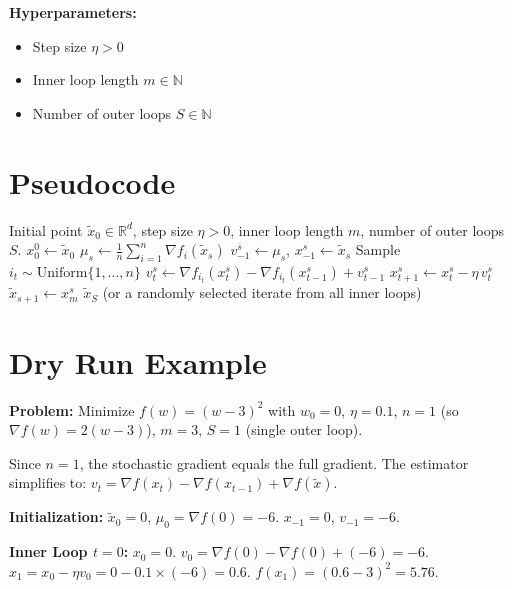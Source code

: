 \documentclass{article}
\newcommand{\R}{\mathbb{R}}
\newcommand{\grad}{\nabla}
\begin{document}
\textbf{Hyperparameters:}
\begin{itemize}
    \item Step size $\eta > 0$
    \item Inner loop length $m \in \mathbb{N}$
    \item Number of outer loops $S \in \mathbb{N}$
\end{itemize}

\section*{Pseudocode}

\begin{algorithm}[H]
\caption{SARAH for Non-Convex Finite-Sum Minimization}
\begin{algorithmic}[1]
\REQUIRE Initial point $\tilde{x}_0 \in \R^d$, step size $\eta > 0$, inner loop length $m$, number of outer loops $S$.
\STATE $x_0^0 \gets \tilde{x}_0$
    \STATE $\mu_s \gets \frac{1}{n} \sum_{i=1}^n \grad f_i(\tilde{x}_s)$ \quad {}
    \STATE $v_{-1}^s \gets \mu_s$, $x_{-1}^s \gets \tilde{x}_s$
        \STATE Sample $i_t \sim \text{Uniform}\{1,\dots,n\}$
        \STATE $v_t^s \gets \grad f_{i_t}(x_t^s) - \grad f_{i_t}(x_{t-1}^s) + v_{t-1}^s$
        \STATE $x_{t+1}^s \gets x_t^s - \eta \, v_t^s$
    \ENDFOR
    \STATE $\tilde{x}_{s+1} \gets x_m^s$ \quad {}
\ENDFOR
\RETURN $\tilde{x}_S$ (or a randomly selected iterate from all inner loops)
\end{algorithmic}
\end{algorithm}

\section*{Dry Run Example}

\textbf{Problem:} Minimize $f(w) = (w-3)^2$ with $w_0 = 0$, $\eta = 0.1$, $n=1$ (so $\grad f(w) = 2(w-3)$), $m=3$, $S=1$ (single outer loop).

Since $n=1$, the stochastic gradient equals the full gradient. The estimator simplifies to:
$v_t = \grad f(x_t) - \grad f(x_{t-1}) + \grad f(\tilde{x})$.

\textbf{Initialization:} $\tilde{x}_0 = 0$, $\mu_0 = \grad f(0) = -6$.
$x_{-1} = 0$, $v_{-1} = -6$.

\textbf{Inner Loop $t=0$:}
$x_0 = 0$.
$v_0 = \grad f(0) - \grad f(0) + (-6) = -6$.
$x_1 = x_0 - \eta v_0 = 0 - 0.1 \times (-6) = 0.6$.
$f(x_1) = (0.6-3)^2 = 5.76$.
\end{document}
